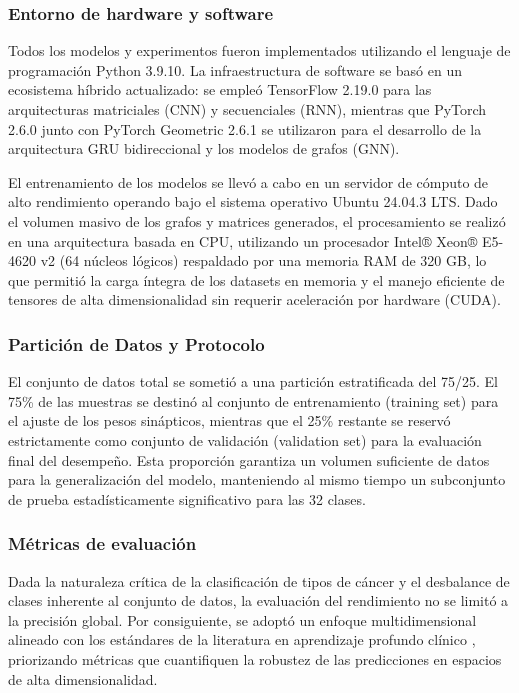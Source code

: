 \documentclass[preprint,number]{elsarticle}
\begin{document}
\subsubsection{Entorno de hardware y software}

Todos los modelos y experimentos fueron implementados utilizando el lenguaje de programación Python 3.9.10. La infraestructura de software se basó en un ecosistema híbrido actualizado: se empleó TensorFlow 2.19.0 para las arquitecturas matriciales (CNN) y secuenciales (RNN), mientras que PyTorch 2.6.0 junto con PyTorch Geometric 2.6.1 se utilizaron para el desarrollo de la arquitectura GRU bidireccional y los modelos de grafos (GNN).

El entrenamiento de los modelos se llevó a cabo en un servidor de cómputo de alto rendimiento operando bajo el sistema operativo Ubuntu 24.04.3 LTS. Dado el volumen masivo de los grafos y matrices generados, el procesamiento se realizó en una arquitectura basada en CPU, utilizando un procesador Intel® Xeon® E5-4620 v2 (64 núcleos lógicos) respaldado por una memoria RAM de 320 GB, lo que permitió la carga íntegra de los datasets en memoria y el manejo eficiente de tensores de alta dimensionalidad sin requerir aceleración por hardware (CUDA).

\subsubsection{Partición de Datos y Protocolo}

El conjunto de datos total se sometió a una partición estratificada del 75/25. El 75\% de las muestras se destinó al conjunto de entrenamiento (training set) para el ajuste de los pesos sinápticos, mientras que el 25\% restante se reservó estrictamente como conjunto de validación (validation set) para la evaluación final del desempeño. Esta proporción garantiza un volumen suficiente de datos para la generalización del modelo, manteniendo al mismo tiempo un subconjunto de prueba estadísticamente significativo para las 32 clases.

\subsubsection{Métricas de evaluación}

Dada la naturaleza crítica de la clasificación de tipos de cáncer y el desbalance de clases inherente al conjunto de datos, la evaluación del rendimiento no se limitó a la precisión global. Por consiguiente, se adoptó un enfoque multidimensional alineado con los estándares de la literatura en aprendizaje profundo clínico \cite{grandini2020metrics}, priorizando métricas que cuantifiquen la robustez de las predicciones en espacios de alta dimensionalidad.
\end{document}
